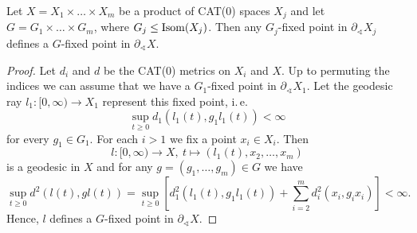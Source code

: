 \begin{lemma}[{\cite[Lemma~2.9]{MR3509968}}]
  \label{lem:2.9}
  Let \(X = X_1 \times \dots \times X_m\) be a product of CAT(0) spaces \(X_j\) and let \(G = G_1 \times \dots \times G_m\), where \(G_j \leq \operatorname{Isom}(X_j)\). Then any \(G_j\)-fixed point in \(\partial_\sphericalangle X_j\) defines a \(G\)-fixed point in \(\partial_\sphericalangle X\).
\end{lemma}

\begin{proof}
  Let \(d_i\) and \(d\) be the CAT(0) metrics on \(X_i\) and \(X\). Up to permuting the indices we can assume that we have a \(G_1\)-fixed point in \(\partial_\sphericalangle X_1\). Let the geodesic ray \(l_1\colon [0,\infty) \to X_1\) represent this fixed point, i.\,e.\
  \[
    \sup_{t \geq 0} d_1(l_1(t), g_1l_1(t)) < \infty
  \]
  for every \(g_1 \in G_1\). For each \(i > 1\) we fix a point \(x_i \in X_i\). Then
  \[
    l\colon [0, \infty) \to X,\ t \mapsto (l_1(t), x_2, \dots, x_m)
  \]
  is a geodesic in \(X\) and for any \(g = (g_1, \dots, g_m) \in G\) we have
  \[
    \sup_{t \geq 0} d^2(l(t), gl(t)) = \sup_{t \geq 0} \left [ d_1^2(l_1(t), g_1l_1(t)) + \sum_{i=2}^m d_i^2(x_i, g_ix_i)\right] < \infty.
  \]
  Hence, \(l\) defines a \(G\)-fixed point in \(\partial_\sphericalangle X\).
\end{proof}


